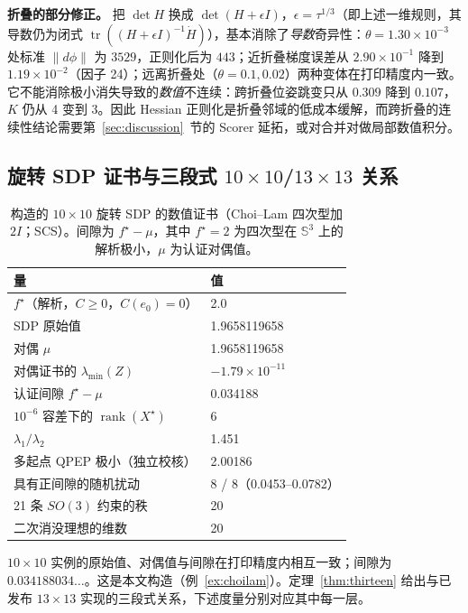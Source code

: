 \textbf{折叠的部分修正。} 把 $\det H$ 换成 $\det(H+\epsilon I)$，$\epsilon=\tau^{1/3}$（即上述一维规则，其导数仍为闭式 $\operatorname{tr}((H+\epsilon I)^{-1}\dot H)$），基本消除了\emph{导数}奇异性：$\theta=1.30\times10^{-3}$ 处标准 $\|d\phi\|$ 为 $3529$，正则化后为 $443$；近折叠梯度误差从 $2.90\times10^{-1}$ 降到 $1.19\times10^{-2}$（因子 24）；远离折叠处（$\theta=0.1,0.02$）两种变体在打印精度内一致。它不能消除极小消失导致的\emph{数值}不连续：跨折叠位姿跳变只从 $0.309$ 降到 $0.107$，$K$ 仍从 4 变到 3。因此 Hessian 正则化是折叠邻域的低成本缓解，而跨折叠的连续性结论需要第~\ref{sec:discussion}~节的 Scorer 延拓，或对合并对做局部数值积分。

\subsection{旋转 SDP 证书与三段式 \texorpdfstring{$10\times10$/$13\times13$}{10x10/13x13} 关系}\label{sec:results_sdp}

\begin{table}[t]
\centering
\caption{构造的 $10\times10$ 旋转 SDP 的数值证书（Choi--Lam 四次型加 $2I$；SCS）。间隙为 $f^\star-\mu$，其中 $f^\star=2$ 为四次型在 $\mathbb{S}^3$ 上的解析极小，$\mu$ 为认证对偶值。}
\label{tab:sdp_cert}
\scriptsize
\setlength{\tabcolsep}{3pt}
\begin{tabular}{@{}p{4.6cm} l@{}}
\toprule
量 & 值\\
\midrule
$f^\star$（解析，$C\ge0$，$C(e_0)=0$） & 2.0\\
SDP 原始值 & 1.9658119658\\
对偶 $\mu$ & 1.9658119658\\
对偶证书的 $\lambda_{\min}(Z)$ & $-1.79\times10^{-11}$\\
认证间隙 $f^\star-\mu$ & 0.034188\\
$10^{-6}$ 容差下的 $\operatorname{rank}(X^\star)$ & 6\\
$\lambda_1/\lambda_2$ & 1.451\\
多起点 QPEP 极小（独立校核） & 2.00186\\
具有正间隙的随机扰动 & 8 / 8（0.0453--0.0782）\\
21 条 $SO(3)$ 约束的秩 & 20\\
二次消没理想的维数 & 20\\
\bottomrule
\end{tabular}
\end{table}

$10\times10$ 实例的原始值、对偶值与间隙在打印精度内相互一致；间隙为 $0.034188034\ldots$。这是本文构造（例~\ref{ex:choilam}）。定理~\ref{thm:thirteen} 给出与已发布 $13\times13$ 实现的三段式关系，下述度量分别对应其中每一层。

